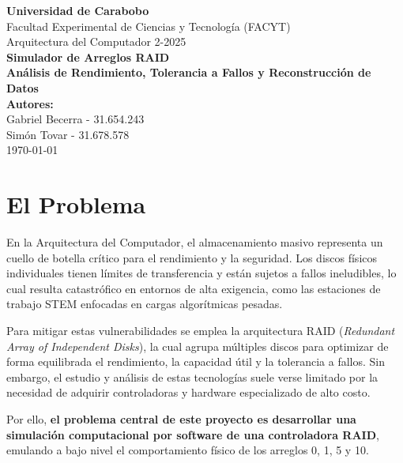 \documentclass[12pt, a4paper]{article}
\begin{document}
\begin{titlepage}
    \centering
    \vspace*{2cm}
    
    {\Large \textbf{Universidad de Carabobo}}\\[0.5cm]
    {\large Facultad Experimental de Ciencias y Tecnología (FACYT)}\\[0.5cm]
    {\large Arquitectura del Computador 2-2025}\\[3cm]
    
    {\Huge \textbf{Simulador de Arreglos RAID}}\\[0.5cm]
    {\large \textbf{Análisis de Rendimiento, Tolerancia a Fallos y Reconstrucción de Datos}}\\[3cm]
    
    \textbf{Autores:}\\[0.2cm]
    Gabriel Becerra - 31.654.243 \\
    Simón Tovar - 31.678.578 \\[2cm]
    
    \vfill
    {\large \today}
\end{titlepage}

\newpage
\tableofcontents
\newpage

\section{El Problema}

En la Arquitectura del Computador, el almacenamiento masivo representa un cuello de botella crítico para el rendimiento y la seguridad. Los discos físicos individuales tienen límites de transferencia y están sujetos a fallos ineludibles, lo cual resulta catastrófico en entornos de alta exigencia, como las estaciones de trabajo STEM enfocadas en cargas algorítmicas pesadas.

Para mitigar estas vulnerabilidades se emplea la arquitectura RAID (\textit{Redundant Array of Independent Disks}), la cual agrupa múltiples discos para optimizar de forma equilibrada el rendimiento, la capacidad útil y la tolerancia a fallos. Sin embargo, el estudio y análisis de estas tecnologías suele verse limitado por la necesidad de adquirir controladoras y hardware especializado de alto costo.

Por ello, \textbf{el problema central de este proyecto es desarrollar una simulación computacional por software de una controladora RAID}, emulando a bajo nivel el comportamiento físico de los arreglos 0, 1, 5 y 10. 
\end{document}
